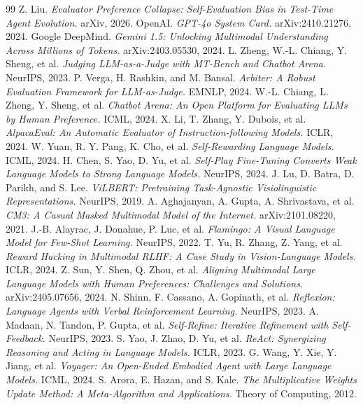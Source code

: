 \documentclass[11pt,a4paper]{article}
\begin{document}

\begin{thebibliography}{99}
 Z. Liu. \textit{Evaluator Preference Collapse: Self-Evaluation Bias in Test-Time Agent Evolution.} arXiv, 2026.
 OpenAI. \textit{GPT-4o System Card.} arXiv:2410.21276, 2024.
 Google DeepMind. \textit{Gemini 1.5: Unlocking Multimodal Understanding Across Millions of Tokens.} arXiv:2403.05530, 2024.
 L. Zheng, W.-L. Chiang, Y. Sheng, et al. \textit{Judging LLM-as-a-Judge with MT-Bench and Chatbot Arena.} NeurIPS, 2023.
 P. Verga, H. Rashkin, and M. Bansal. \textit{Arbiter: A Robust Evaluation Framework for LLM-as-Judge.} EMNLP, 2024.
 W.-L. Chiang, L. Zheng, Y. Sheng, et al. \textit{Chatbot Arena: An Open Platform for Evaluating LLMs by Human Preference.} ICML, 2024.
 X. Li, T. Zhang, Y. Dubois, et al. \textit{AlpacaEval: An Automatic Evaluator of Instruction-following Models.} ICLR, 2024.
 W. Yuan, R. Y. Pang, K. Cho, et al. \textit{Self-Rewarding Language Models.} ICML, 2024.
 H. Chen, S. Yao, D. Yu, et al. \textit{Self-Play Fine-Tuning Converts Weak Language Models to Strong Language Models.} NeurIPS, 2024.
 J. Lu, D. Batra, D. Parikh, and S. Lee. \textit{ViLBERT: Pretraining Task-Agnostic Visiolinguistic Representations.} NeurIPS, 2019.
 A. Aghajanyan, A. Gupta, A. Shrivastava, et al. \textit{CM3: A Casual Masked Multimodal Model of the Internet.} arXiv:2101.08220, 2021.
 J.-B. Alayrac, J. Donahue, P. Luc, et al. \textit{Flamingo: A Visual Language Model for Few-Shot Learning.} NeurIPS, 2022.
 T. Yu, R. Zhang, Z. Yang, et al. \textit{Reward Hacking in Multimodal RLHF: A Case Study in Vision-Language Models.} ICLR, 2024.
 Z. Sun, Y. Shen, Q. Zhou, et al. \textit{Aligning Multimodal Large Language Models with Human Preferences: Challenges and Solutions.} arXiv:2405.07656, 2024.
 N. Shinn, F. Cassano, A. Gopinath, et al. \textit{Reflexion: Language Agents with Verbal Reinforcement Learning.} NeurIPS, 2023.
 A. Madaan, N. Tandon, P. Gupta, et al. \textit{Self-Refine: Iterative Refinement with Self-Feedback.} NeurIPS, 2023.
 S. Yao, J. Zhao, D. Yu, et al. \textit{ReAct: Synergizing Reasoning and Acting in Language Models.} ICLR, 2023.
 G. Wang, Y. Xie, Y. Jiang, et al. \textit{Voyager: An Open-Ended Embodied Agent with Large Language Models.} ICML, 2024.
 S. Arora, E. Hazan, and S. Kale. \textit{The Multiplicative Weights Update Method: A Meta-Algorithm and Applications.} Theory of Computing, 2012.


\end{thebibliography}
\end{document}
